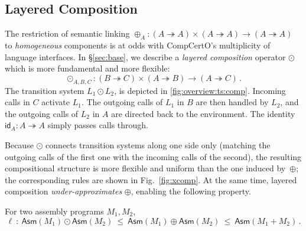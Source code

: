 \documentclass[acmsmall,screen,review,anonymous]{acmart}
\newcommand{\kw}[1]{\ensuremath{ \mathsf{#1} }}
\begin{document}
\subsection{Layered Composition} \label{sec:overview:lcomp} %

The restriction of semantic linking
$
  {\oplus}_A : (A \twoheadrightarrow A) \times (A \twoheadrightarrow A)
  \rightarrow (A \twoheadrightarrow A)
$
to \emph{homogeneous} components
is at odds with
CompCertO's multiplicity of language interfaces.
In \S\ref{sec:base},
we describe a \emph{layered composition} operator $\odot$
which is more fundamental and more flexible:
\[
  {\odot}_{A,B,C} :
    (B \twoheadrightarrow C) \times
    (A \twoheadrightarrow B) \rightarrow
    (A \twoheadrightarrow C)
  \,.
\]
The transition system $L_1 \odot L_2$,
is depicted in \autoref{fig:overview:ts:comp}.
Incoming calls in $C$ activate $L_1$.
The outgoing calls of $L_1$ in $B$ are then handled by $L_2$, and
the outgoing calls of $L_2$ in $A$
are directed back to the environment.
The identity $\kw{id}_A : A \twoheadrightarrow A$
simply passes calls through.


Because $\odot$ connects transition systems
along one side only
(matching the outgoing calls of the first one with
the incoming calls of the second),
the resulting compositional structure
is more flexible and uniform
than the one induced by~$\oplus$;
the corresponding rules are shown
in Fig.~\ref{fig:xcomp}.
%
At the same time, layered composition
\emph{under-approximates} $\oplus$,
enabling the following property.

\begin{theorem} \label{thm:linking}
For two assembly programs $M_1, M_2$,
\[
  \ell\::\:
  \kw{Asm}(M_1) \odot \kw{Asm}(M_2)
  \:\le\:
  \kw{Asm}(M_1) \oplus \kw{Asm}(M_2)
  \:\le\:
  \kw{Asm}(M_1 + M_2)
 \,.
\]
\end{theorem}
\end{document}
